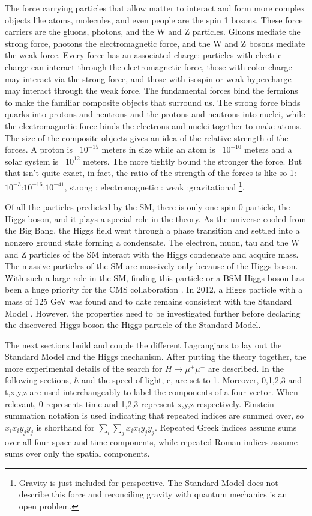 The force carrying particles that allow matter to interact and form more complex objects like atoms, molecules, and even people are the spin 1 bosons. These force carriers are the gluons, photons, and the W and Z particles. Gluons mediate the strong force, photons the electromagnetic force, and the W and Z bosons mediate the weak force. Every force has an associated charge: particles with electric charge can interact through the electromagnetic force, those with color charge may interact via the strong force, and those with isospin or weak hypercharge may interact through the weak force. The fundamental forces bind the fermions to make the familiar composite objects that surround us. The strong force binds quarks into protons and neutrons and the protons and neutrons into nuclei, while the electromagnetic force binds the electrons and nuclei together to make atoms. The size of the composite objects gives an idea of the relative strength of the forces. A proton is ~$10^{-15}$ meters in size while an atom is ~$10^{-10}$ meters and a solar system is ~$10^{12}$ meters. The more tightly bound the stronger the force. But that isn't quite exact, in fact, the ratio of the strength of the forces is like so 1:$10^{-3}$:$10^{-16}$:$10^{-41}$, strong : electromagnetic : weak :gravitational \footnote{Gravity is just included for perspective. The Standard Model does not describe this force and reconciling gravity with quantum mechanics is an open problem.}. 

Of all the particles predicted by the SM, there is only one spin 0 particle, the Higgs boson, and it plays a special role in the theory. As the universe cooled from the Big Bang, the Higgs field went through a phase transition and settled into a nonzero ground state forming a condensate. The electron, muon, tau and the W and Z particles of the SM interact with the Higgs condensate and acquire mass. The massive particles of the SM are massively only because of the Higgs boson. With such a large role in the SM, finding this particle or a BSM Higgs boson has been a huge priority for the CMS collaboration \cite{tdr}. In 2012, a Higgs particle with a mass of 125 GeV was found and to date remains consistent with the Standard Model \cite{atlasdiscovery,cmsdiscovery2012,cmsdiscovery2013}. However, the properties need to be investigated further before declaring the discovered Higgs boson the Higgs particle of the Standard Model. 

The next sections build and couple the different Lagrangians to lay out the Standard Model and the Higgs mechanism. After putting the theory together, the more experimental details of the search for $H\rightarrow\mu^+\mu^-$ are described. In the following sections, $\hbar$ and the speed of light, c, are set to 1. Moreover, 0,1,2,3 and t,x,y,z are used interchangeably to label the components of a four vector. When relevant, 0 represents time and 1,2,3 represent x,y,z respectively. Einstein summation notation is used indicating that repeated indices are summed over, so $x_ix_i y_jy_j$ is shorthand for $\sum_i\sum_j x_ix_i y_jy_j$. Repeated Greek indices assume sums over all four space and time components, while repeated Roman indices assume sums over only the spatial components. 

